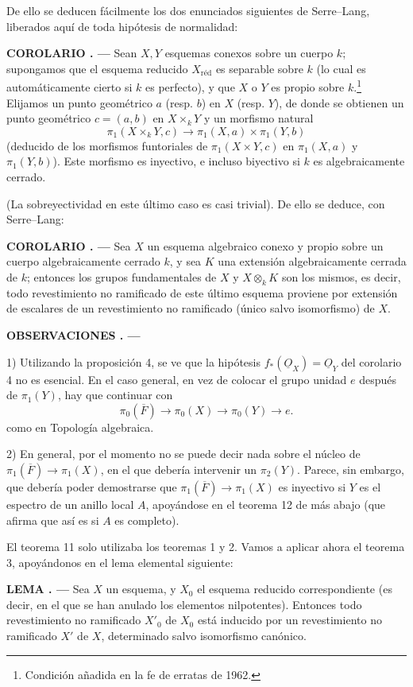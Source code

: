 \documentclass[11pt,twoside,openany]{book}
\numberwithin{equation}{section}
\newcommand{\src}[1]{%
  \phantomsection\hypertarget{src:#1}{}%
  \marginpar{\raggedleft\footnotesize\sffamily #1}%
}
\newcommand{\Osh}{\underline{O}}
\theoremstyle{plain}
\theoremstyle{definition}
\theoremstyle{remark}
\newcommand{\result}[2]{%
  \par\medskip\noindent\textbf{#1%
  \if\relax\detokenize{#2}\relax\else\space#2\fi. ---}\enspace
}
\newcommand{\FgaUnitKey}{frontmatter}
\renewcommand{\src}[1]{%
  \phantomsection\hypertarget{src:\FgaUnitKey:#1}{}%
  \marginpar{\raggedleft\footnotesize\sffamily #1}%
}
\theoremstyle{plain}
\theoremstyle{definition}
\theoremstyle{remark}
\begin{document}
De ello se deducen fácilmente los dos enunciados siguientes de Serre--Lang,
liberados aquí de toda hipótesis de normalidad:

\result{COROLARIO}{5} Sean $X,Y$ esquemas conexos sobre un cuerpo $k$;
supongamos que el esquema reducido $X_{\mathrm{réd}}$ es separable sobre $k$
(lo cual es automáticamente cierto si $k$ es perfecto), y que $X$ o $Y$ es
propio sobre $k$.\footnote{Condición añadida en la fe de erratas de 1962.}
Elijamos un punto geométrico $a$ (resp. $b$) en $X$ (resp. $Y$), de donde se
obtienen un punto geométrico $c=(a,b)$ en $X\times_kY$ y un morfismo natural
\[
  \pi_1(X\times_kY,c)\longrightarrow
  \pi_1(X,a)\times\pi_1(Y,b)
\]
(deducido de los morfismos funtoriales de $\pi_1(X\times Y,c)$ en $\pi_1(X,a)$
y $\pi_1(Y,b)$). Este morfismo es inyectivo, e incluso biyectivo si $k$ es
algebraicamente cerrado.

(La sobreyectividad en este último caso es casi trivial). De ello se deduce,
con Serre--Lang:

\result{COROLARIO}{6} Sea $X$ un esquema algebraico conexo y propio sobre un cuerpo
algebraicamente cerrado $k$, y sea $K$ una extensión algebraicamente cerrada
de $k$; entonces los grupos fundamentales de $X$ y $X\otimes_kK$ son los
mismos, es decir, todo revestimiento no ramificado de este último esquema
proviene por extensión de escalares de un revestimiento no ramificado (único
salvo isomorfismo) de $X$.

\result{OBSERVACIONES}{}

1) Utilizando la proposición 4, se ve que la hipótesis
$f_*(\Osh_X)=\Osh_Y$ del corolario 4 no es esencial. En el caso general, en vez
de colocar el grupo unidad $e$ después de $\pi_1(Y)$, hay que continuar con
\[
  \pi_0(\overline F)\longrightarrow\pi_0(X)
  \longrightarrow\pi_0(Y)\longrightarrow e.
\]
como en Topología algebraica.

\src{216}
2) En general, por el momento no se puede decir nada sobre el núcleo de
$\pi_1(\overline F)\longrightarrow\pi_1(X)$, en el que debería intervenir un
$\pi_2(Y)$. Parece, sin embargo, que debería poder demostrarse que
$\pi_1(\overline F)\longrightarrow\pi_1(X)$ es inyectivo si $Y$ es el espectro
de un anillo local $A$, apoyándose en el teorema 12 de más abajo (que afirma que
así es si $A$ es completo).

El teorema 11 solo utilizaba los teoremas 1 y 2. Vamos a aplicar ahora el
teorema 3, apoyándonos en el lema elemental siguiente:

\result{LEMA}{6} Sea $X$ un esquema, y $X_0$ el esquema reducido correspondiente
(es decir, en el que se han anulado los elementos nilpotentes). Entonces todo
revestimiento no ramificado $X'_0$ de $X_0$ está inducido por un revestimiento
no ramificado $X'$ de $X$, determinado salvo isomorfismo canónico.
\end{document}
